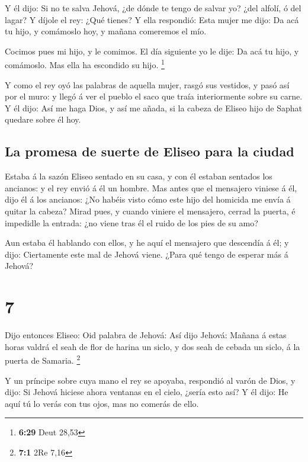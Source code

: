  Y él dijo: Si no te salva Jehová, ¿de dónde te tengo de
salvar yo? ¿del alfolí, ó del lagar?  Y díjole el rey: ¿Qué
tienes? Y ella respondió: Esta mujer me dijo: Da acá tu hijo, y
comámoslo hoy, y mañana comeremos el mío.

 Cocimos pues mi hijo, y le comimos. El día siguiente yo le
dije: Da acá tu hijo, y comámoslo. Mas ella ha escondido su hijo.
\footnote{\textbf{6:29} Deut 28,53}

 Y como el rey oyó las palabras de aquella mujer, rasgó sus
vestidos, y pasó así por el muro: y llegó á ver el pueblo el saco que
traía interiormente sobre su carne.  Y él dijo: Así me haga
Dios, y así me añada, si la cabeza de Eliseo hijo de Saphat quedare
sobre él hoy.

\hypertarget{la-promesa-de-suerte-de-eliseo-para-la-ciudad}{%
\subsection{La promesa de suerte de Eliseo para la
ciudad}\label{la-promesa-de-suerte-de-eliseo-para-la-ciudad}}

 Estaba á la sazón Eliseo sentado en su casa, y con él
estaban sentados los ancianos: y el rey envió á él un hombre. Mas antes
que el mensajero viniese á él, dijo él á los ancianos: ¿No habéis visto
cómo este hijo del homicida me envía á quitar la cabeza? Mirad pues, y
cuando viniere el mensajero, cerrad la puerta, é impedidle la entrada:
¿no viene tras él el ruido de los pies de su amo?

 Aun estaba él hablando con ellos, y he aquí el mensajero
que descendía á él; y dijo: Ciertamente este mal de Jehová viene. ¿Para
qué tengo de esperar más á Jehová?

\hypertarget{section-6}{%
\section{7}\label{section-6}}

 Dijo entonces Eliseo: Oid palabra de Jehová: Así dijo
Jehová: Mañana á estas horas valdrá el seah de flor de harina un siclo,
y dos seah de cebada un siclo, á la puerta de Samaria. \footnote{\textbf{7:1}
  2Re 7,16}

 Y un príncipe sobre cuya mano el rey se apoyaba, respondió
al varón de Dios, y dijo: Si Jehová hiciese ahora ventanas en el cielo,
¿sería esto así? Y él dijo: He aquí tú lo verás con tus ojos, mas no
comerás de ello.

